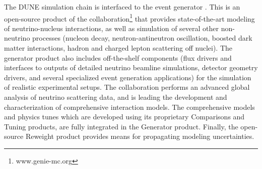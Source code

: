 The DUNE  simulation chain is interfaced to the  event generator \cite{Andreopoulos:2009rq}. This is an open-source product of the  collaboration\footnote{www.genie-mc.org}  that provides state-of-the-art modeling of neutrino-nucleus interactions, as well as simulation of several other non-neutrino processes (nucleon decay, neutron-antineutron oscillation, boosted dark matter interactions, hadron and charged lepton scattering off nuclei). The generator product also includes off-the-shelf components (flux drivers and interfaces to outputs of detailed neutrino beamline simulations, detector geometry drivers, and several specialized event generation applications) for the simulation of realistic experimental setups. The  collaboration performs an advanced global analysis of neutrino scattering data, and is leading the development and characterization of comprehensive interaction models. The  comprehensive models and physics tunes which are developed using its proprietary Comparisons and Tuning products, are fully integrated in the  Generator product. Finally, the open-source  Reweight product provides means for propagating modeling uncertainties. 

